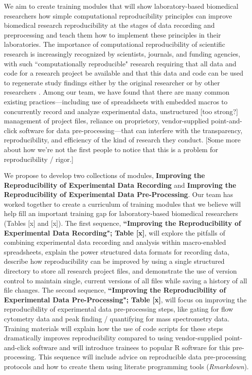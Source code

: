 \documentclass[pdftex,english,11pt,parskip=half]{scrartcl}
\begin{document}
We aim to create training modules that will show laboratory-based biomedical researchers how simple computational reproducibility principles can improve biomedical research reproducibility at the stages of data recording and preprocessing and teach them how to implement these principles in their laboratories. The importance of computational reproducibility of scientific research is increasingly recognized by scientists, journals, and funding agencies, with such ``computationally reproducible" research requiring that all data and code for a research project be available and that this data and code can be used to regenerate study findings either by the original researcher or by other researchers \cite{ellis2017share, ram2013git}. Among our team, we have found that there are many common existing practices---including use of spreadsheets with embedded macros to concurrently record and analyze experimental data, unstructured [too strong?] management of project files, reliance on proprietory, vendor-supplied point-and-click software for data pre-processing---that can interfere with the transparency, reproducibility, and efficiency of the kind of research they conduct. [Some more about how we're not the first people to notice that this is a problem for reproducibility / rigor.] 

We propose to develop two collections of modules, \textbf{Improving the Reproducibility of Experimental Data Recording} and \textbf{Improving the Reproducibility of Experimental Data Pre-Processing}. Our team has worked together to create a curriculum of training modules that we believe will help fill an important training gap for laboratory-based biomedical researchers (Tables [x] and [x]). The first sequence, \textbf{``Improving the Reproducibility of Experimental Data Recording"; Table [x]}, will explore the pitfalls of combining experimental data recording and analysis within macro-enabled spreadsheets, explain the power structured data formats for recording data, describe how reproducibility can be improved by using a single structured directory to store all research project files, and demonstrate the use of version control to maintain single, current versions of all files while saving a history of all file changes. The second sequence, \textbf{``Improving the Reproducibility of Experimental Data Pre-Processing"; Table [x]}, will focus on improving the reproducibility of experimental data pre-processing steps, like gating for flow cytometry data and peak finding / quantifying for mass spectrometry data. Training materials will explain how the use of code scripts for these steps dramatically improves reproducibility compared to using vendor-supplied point-and-click software and will introduce trainees to popular R software for this pre-processing. This sequence will include advice on reproducible data pre-processing protocols and how to create them using literate programming tools (\textit{Rmarkdown}).
\end{document}

